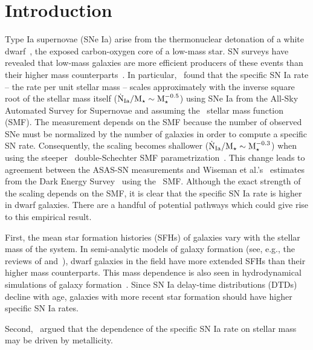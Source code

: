 \documentclass[ms.tex]{subfiles}
\begin{document}
\section{Introduction}
\label{sec:intro}

Type Ia supernovae (SNe Ia) arise from the thermonuclear detonation of a white
dwarf~\citep[WD;][]{Hoyle1960, Colgate1969}, the exposed carbon-oxygen core of
a low-mass star.
SN surveys have revealed that low-mass galaxies are more efficient producers
of these events than their higher mass counterparts~\citep[e.g.,][]{Mannucci2005,
Sullivan2006, Li2011, Smith2012}.
In particular,~\citet{Brown2019} found that the specific SN Ia rate -- the rate
per unit stellar mass -- scales approximately with the inverse square root of
the stellar mass itself ($\dot{\text{N}}_\text{Ia} / \text{M}_\star \sim \text{M}_\star^{-0.5}$)
using SNe Ia from the All-Sky Automated Survey for Supernovae
\citep[ASAS-SN;][]{Shappee2014, Kochanek2017} and assuming the~\citet{Bell2003}
stellar mass function (SMF).
The measurement depends on the SMF because the number of
observed SNe must be normalized by the number of galaxies in order to compute a
specific SN rate.
Consequently, the scaling becomes shallower ($\dot{\text{N}}_\text{Ia} / \text{M}_\star
\sim \text{M}_\star^{-0.3}$) when using the steeper~\citet{Baldry2012} double-Schechter
SMF parametrization~\citep{Gandhi2022}.
This change leads to agreement between the ASAS-SN measurements and Wiseman et
al.'s~\citeyearpar{Wiseman2021} estimates from the Dark Energy
Survey~\citep[DES;][]{DES2016} using the~\citet{Baldry2012} SMF.
Although the exact strength of the scaling depends on the SMF, it is clear
that the specific SN Ia rate is higher in dwarf galaxies.
There are a handful of potential pathways which could give rise to this
empirical result.
\par
First, the mean star formation histories (SFHs) of galaxies vary with the
stellar mass of the system.
In semi-analytic models of galaxy formation (see, e.g., the reviews of
\citealt{Baugh2006} and~\citealt{Somerville2015a}), dwarf galaxies in the field
have more extended SFHs than their higher mass counterparts.
This mass dependence is also seen in hydrodynamical simulations of galaxy
formation~\citep[e.g.,][]{GarrisonKimmel2019}.
Since SN Ia delay-time distributions (DTDs) decline with age, galaxies with
more recent star formation should have higher specific SN Ia rates.
\par
Second,~\citet{Kistler2013} argued that the dependence of the specific SN Ia
rate on stellar mass may be driven by metallicity.
\end{document}
